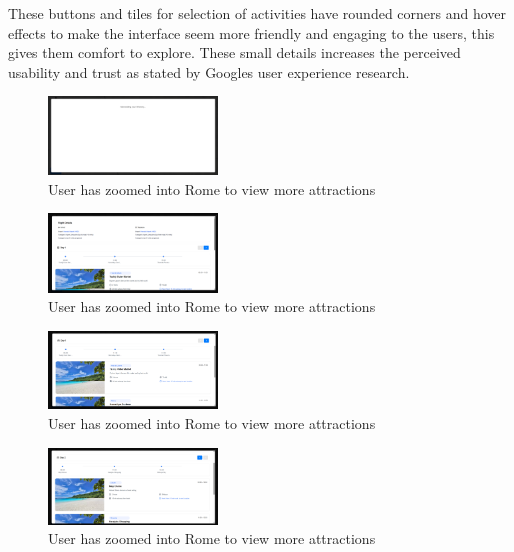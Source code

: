 \documentclass[]{project_final}
\begin{document}
These buttons and tiles for selection of activities have rounded corners and hover effects to make the interface seem more friendly and engaging to the users, this gives them comfort to explore. These small details increases the perceived usability and trust as stated by Googles user experience research.

\begin{figure}[ht!]
  \centering
  \includegraphics[width=0.4\textwidth]{loading screen.png}
  \caption{User has zoomed into Rome to view more attractions}
  \label{fig:1}
\end{figure}

\begin{figure}[ht!]
  \centering
  \includegraphics[width=0.4\textwidth]{itin1.png}
  \caption{User has zoomed into Rome to view more attractions}
  \label{fig:1}
\end{figure}

\begin{figure}[ht!]
  \centering
  \includegraphics[width=0.4\textwidth]{itin2.png}
  \caption{User has zoomed into Rome to view more attractions}
  \label{fig:1}
\end{figure}

\begin{figure}[ht!]
  \centering
  \includegraphics[width=0.4\textwidth]{itin3.png}
  \caption{User has zoomed into Rome to view more attractions}
  \label{fig:1}
\end{figure}
\end{document}
